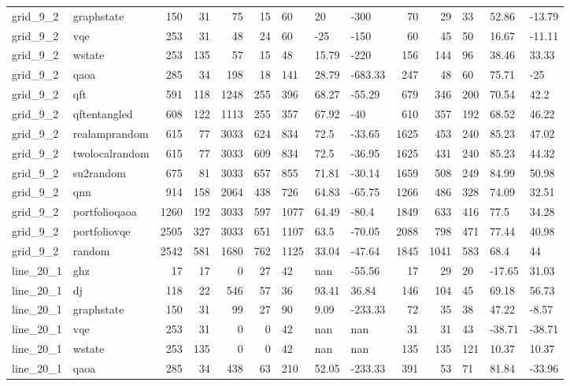 \begin{longtable}{llrrrrlllrrlll}
grid\_9\_2 & graphstate & 150 & 31 & 75 & 15 & 60 & 20 & -300 & 70 & 29 & 33 & 52.86 & -13.79 \\
grid\_9\_2 & vqe & 253 & 31 & 48 & 24 & 60 & -25 & -150 & 60 & 45 & 50 & 16.67 & -11.11 \\
grid\_9\_2 & wstate & 253 & 135 & 57 & 15 & 48 & 15.79 & -220 & 156 & 144 & 96 & 38.46 & 33.33 \\
grid\_9\_2 & qaoa & 285 & 34 & 198 & 18 & 141 & 28.79 & -683.33 & 247 & 48 & 60 & 75.71 & -25 \\
grid\_9\_2 & qft & 591 & 118 & 1248 & 255 & 396 & 68.27 & -55.29 & 679 & 346 & 200 & 70.54 & 42.2 \\
grid\_9\_2 & qftentangled & 608 & 122 & 1113 & 255 & 357 & 67.92 & -40 & 610 & 357 & 192 & 68.52 & 46.22 \\
grid\_9\_2 & realamprandom & 615 & 77 & 3033 & 624 & 834 & 72.5 & -33.65 & 1625 & 453 & 240 & 85.23 & 47.02 \\
grid\_9\_2 & twolocalrandom & 615 & 77 & 3033 & 609 & 834 & 72.5 & -36.95 & 1625 & 431 & 240 & 85.23 & 44.32 \\
grid\_9\_2 & su2random & 675 & 81 & 3033 & 657 & 855 & 71.81 & -30.14 & 1659 & 508 & 249 & 84.99 & 50.98 \\
grid\_9\_2 & qnn & 914 & 158 & 2064 & 438 & 726 & 64.83 & -65.75 & 1266 & 486 & 328 & 74.09 & 32.51 \\
grid\_9\_2 & portfolioqaoa & 1260 & 192 & 3033 & 597 & 1077 & 64.49 & -80.4 & 1849 & 633 & 416 & 77.5 & 34.28 \\
grid\_9\_2 & portfoliovqe & 2505 & 327 & 3033 & 651 & 1107 & 63.5 & -70.05 & 2088 & 798 & 471 & 77.44 & 40.98 \\
grid\_9\_2 & random & 2542 & 581 & 1680 & 762 & 1125 & 33.04 & -47.64 & 1845 & 1041 & 583 & 68.4 & 44 \\
line\_20\_1 & ghz & 17 & 17 & 0 & 27 & 42 & nan & -55.56 & 17 & 29 & 20 & -17.65 & 31.03 \\
line\_20\_1 & dj & 118 & 22 & 546 & 57 & 36 & 93.41 & 36.84 & 146 & 104 & 45 & 69.18 & 56.73 \\
line\_20\_1 & graphstate & 150 & 31 & 99 & 27 & 90 & 9.09 & -233.33 & 72 & 35 & 38 & 47.22 & -8.57 \\
line\_20\_1 & vqe & 253 & 31 & 0 & 0 & 42 & nan & nan & 31 & 31 & 43 & -38.71 & -38.71 \\
line\_20\_1 & wstate & 253 & 135 & 0 & 0 & 42 & nan & nan & 135 & 135 & 121 & 10.37 & 10.37 \\
line\_20\_1 & qaoa & 285 & 34 & 438 & 63 & 210 & 52.05 & -233.33 & 391 & 53 & 71 & 81.84 & -33.96 \\

\end{longtable}
